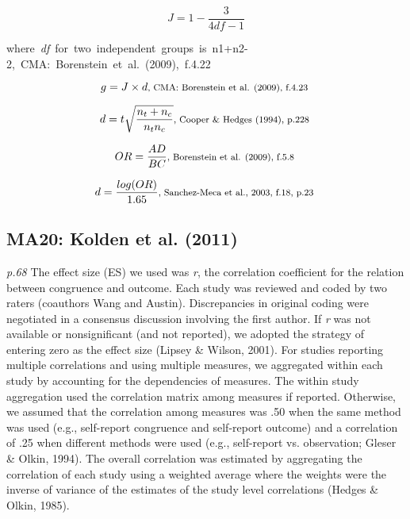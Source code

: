 \documentclass{article}
\begin{document}
\begin{equation*}
J={1-{\frac {3}{4df-1}}} 
\end{equation*} 

\mbox {\footnotesize where \textit{df} for two independent groups is n1+n2-2, CMA: Borenstein et al. (2009), f.4.22 }

\begin{equation*}
g=J \times d \mbox{\footnotesize, CMA: Borenstein et al. (2009), f.4.23 } 
\end{equation*}

\begin{equation*}
d = {t {\sqrt {\frac {n_{t} + n_{c}}{n_{t}n_{c}}}}} \mbox{\footnotesize, Cooper \& Hedges (1994), p.228 }
\end{equation*}

\begin{equation*}
OR={\frac {AD}{BC}} \mbox{\footnotesize, Borenstein et al. (2009), f.5.8 }
\end{equation*}

\begin{equation*}
d=\frac{log(OR)}{1.65} \mbox{\footnotesize, Sanchez-Meca et al., 2003, f.18, p.23 }
\end{equation*}


\subsection*{MA20: Kolden et al. (2011)}

\textit{p.68} The effect size (ES) we used was \textit{r}, the correlation coefficient for the relation between congruence and outcome. Each study was reviewed and coded by two raters (coauthors Wang and Austin). Discrepancies in original coding were negotiated in a consensus discussion involving the first author. If \textit{r} was not available or nonsignificant (and not reported), we adopted the strategy of entering zero as the effect size (Lipsey \& Wilson, 2001). For studies reporting multiple correlations and using multiple measures, we aggregated within each study by accounting for the dependencies of measures. The within study aggregation used the correlation matrix among measures if reported. Otherwise, we assumed that the correlation among measures was .50 when the same method was used (e.g., self-report congruence and self-report outcome) and a correlation of .25 when different methods were used (e.g., self-report vs. observation; Gleser \& Olkin, 1994). The overall correlation was estimated by aggregating the correlation of each study using a weighted average where the weights were the inverse of variance of the estimates of the study level correlations (Hedges \& Olkin, 1985).
\end{document}
